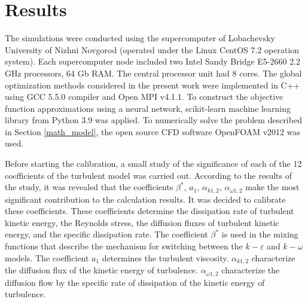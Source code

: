 \documentclass[mathematics,article,submit,pdftex,moreauthors]{Definitions/mdpi}
\begin{document}
\section{Results}





The simulations were conducted using the supercomputer of Lobachevsky University of Nizhni Novgorod (operated under the Linux CentOS 7.2 operation system). Each supercomputer node included two Intel Sandy Bridge E5-2660 2.2 GHz processors, 64 Gb RAM. The central processor unit had 8 cores. 
The global optimization methods considered in the present work were implemented in C++ using GCC 5.5.0 compiler and Open MPI v4.1.1. To construct the objective function approximations using a neural network, scikit-learn machine learning library from Python 3.9 was applied. 
To numerically solve the problem described in Section \ref{math_model}, the open source CFD software OpenFOAM v2012 \cite{OpenFOAM} was used.

Before starting the calibration, a small study of the significance of each of the 12 coefficients of the turbulent model was carried out. According to the results of the study, it was revealed that the coefficients $\beta^*$, $a_1$, $\alpha_{k 1,2}$, $\alpha_{\omega 1,2}$ make the most significant contribution to the calculation results. It was decided to calibrate these coefficients. These coefficients determine the dissipation rate of turbulent kinetic energy, the Reynolds stress, the diffusion fluxes of turbulent kinetic energy, and the specific dissipation rate. The coefficient $\beta^*$ is used in the mixing functions that describe the mechanism for switching between the $k-\varepsilon$ and $k-\omega$ models. The coefficient $a_1$ determines the turbulent viscosity. $\alpha_{k 1,2}$ characterize the diffusion flux of the kinetic energy of turbulence. $\alpha_{\omega 1,2}$ characterize the diffusion flow by the specific rate of dissipation of the kinetic energy of turbulence.
\end{document}
